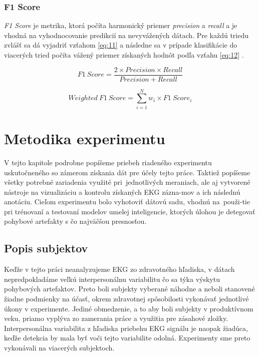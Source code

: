 \subsection{F1 Score}

\textit{F1 Score} je metrika, ktorá počíta harmonický priemer \textit{precision} a \textit{recall} a je vhodná na vyhodnocovanie predikcií na nevyvážených dátach. Pre každú triedu zvlášť sa dá vyjadriť vzťahom \ref{eq:11} a následne sa v prípade klasifikácie do viacerých tried počíta vážený priemer získaných hodnôt podľa vzťahu \ref{eq:12} \cite{grandini2020metrics}.

\begin{equation} 
    \label{eq:11}
    F1 \ Score = \frac{2 \times Precision \times Recall}{Precision + Recall}
\end{equation}

\begin{equation} 
    \label{eq:12}
    Weighted \ F1 \ Score = \sum_{i=1}^{N} w_i \times F1 \ Score_i
\end{equation}



\chapter{Metodika experimentu}

V tejto kapitole podrobne popíšeme priebeh riadeného experimentu uskutočneného so zámerom získania dát pre účely tejto práce. Taktiež popíšeme všetky potrebné zariadenia využité pri~jednotlivých meraniach, ale aj vytvorené nástroje na vizualizáciu a kontrolu získaných EKG zázna-mov a ich následnú anotáciu. Cieľom experimentu bolo vyhotoviť dátovú sadu, vhodnú na~použi-tie pri trénovaní a testovaní modelov umelej inteligencie, ktorých úlohou je detegovať pohybové artefakty s čo najväčšou presnosťou.


\section{Popis subjektov}

Keďže v tejto práci neanalyzujeme EKG zo zdravotného hľadiska, v dátach nepredpokladáme veľkú interpersonálnu variabilitu čo sa týka výskytu pohybových artefaktov. Preto boli subjekty vyberané náhodne a neboli stanovené žiadne podmienky na účasť, okrem zdravotnej spôsobilosti vykonávať jednotlivé úkony v experimente. Jediné obmedzenie, a to aby boli subjekty v produktívnom veku, priamo vyplýva zo zamerania práce a využitia pre zásahové zložky. Interpersonálna variabilita z hľadiska priebehu EKG signálu je naopak žiadúca, keďže detekcia by mala byť voči tejto variabilite odolná. Experimenty sme preto vykonávali na viacerých subjektoch.

